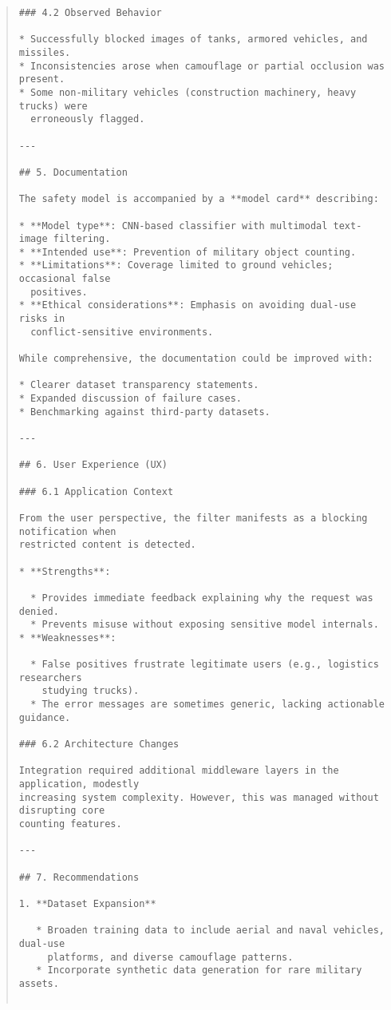 \documentclass[11pt]{article}
\begin{document}
\begin{quote}
\begin{verbatim}
### 4.2 Observed Behavior

* Successfully blocked images of tanks, armored vehicles, and missiles.
* Inconsistencies arose when camouflage or partial occlusion was present.
* Some non-military vehicles (construction machinery, heavy trucks) were
  erroneously flagged.

---

## 5. Documentation

The safety model is accompanied by a **model card** describing:

* **Model type**: CNN-based classifier with multimodal text-image filtering.
* **Intended use**: Prevention of military object counting.
* **Limitations**: Coverage limited to ground vehicles; occasional false
  positives.
* **Ethical considerations**: Emphasis on avoiding dual-use risks in
  conflict-sensitive environments.

While comprehensive, the documentation could be improved with:

* Clearer dataset transparency statements.
* Expanded discussion of failure cases.
* Benchmarking against third-party datasets.

---

## 6. User Experience (UX)

### 6.1 Application Context

From the user perspective, the filter manifests as a blocking notification when
restricted content is detected.

* **Strengths**:

  * Provides immediate feedback explaining why the request was denied.
  * Prevents misuse without exposing sensitive model internals.
* **Weaknesses**:

  * False positives frustrate legitimate users (e.g., logistics researchers
    studying trucks).
  * The error messages are sometimes generic, lacking actionable guidance.

### 6.2 Architecture Changes

Integration required additional middleware layers in the application, modestly
increasing system complexity. However, this was managed without disrupting core
counting features.

---

## 7. Recommendations

1. **Dataset Expansion**

   * Broaden training data to include aerial and naval vehicles, dual-use
     platforms, and diverse camouflage patterns.
   * Incorporate synthetic data generation for rare military assets.


\end{verbatim}
\end{quote}
\end{document}
